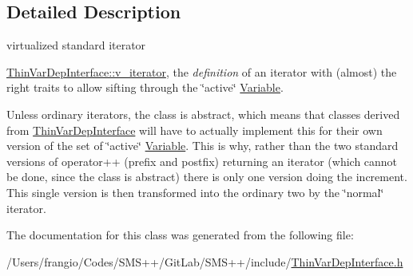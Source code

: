\subsection{Detailed Description}
virtualized standard iterator 

\mbox{\hyperlink{class_s_m_spp__di__unipi__it_1_1_thin_var_dep_interface_1_1v__iterator}{Thin\+Var\+Dep\+Interface\+::v\+\_\+iterator}}, the {\itshape definition} of an iterator with (almost) the right traits to allow sifting through the \char`\"{}active\char`\"{} \mbox{\hyperlink{class_s_m_spp__di__unipi__it_1_1_variable}{Variable}}.

Unless ordinary iterators, the class is abstract, which means that classes derived from \mbox{\hyperlink{class_s_m_spp__di__unipi__it_1_1_thin_var_dep_interface}{Thin\+Var\+Dep\+Interface}} will have to actually implement this for their own version of the set of \char`\"{}active\char`\"{} \mbox{\hyperlink{class_s_m_spp__di__unipi__it_1_1_variable}{Variable}}. This is why, rather than the two standard versions of operator++ (prefix and postfix) returning an iterator (which cannot be done, since the class is abstract) there is only one version doing the increment. This single version is then transformed into the ordinary two by the \char`\"{}normal\char`\"{} iterator. 

The documentation for this class was generated from the following file\+:\begin{DoxyCompactItemize}
\item 
/\+Users/frangio/\+Codes/\+S\+M\+S++/\+Git\+Lab/\+S\+M\+S++/include/\mbox{\hyperlink{_thin_var_dep_interface_8h}{Thin\+Var\+Dep\+Interface.\+h}}\end{DoxyCompactItemize}
